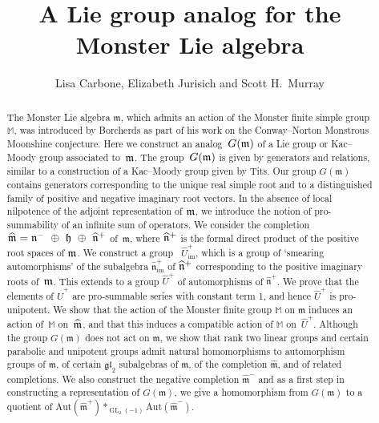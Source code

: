 \documentclass[11pt,letterpaper]{amsart}
\numberwithin{thecounter}{section}
\theoremstyle{definition}
\DeclareMathOperator{\GL}{GL}
\DeclareMathOperator{\Aut}{Aut}
\DeclareMathOperator{\Exp}{Exp}
\DeclareMathOperator{\Ad}{Ad}
\DeclareMathOperator{\im}{{im}}
\newcommand{\M}{{\mathbb M}}
\newcommand{\Uhp}{{\widehat{U}^+}}
\newcommand{\Uhimp}{{\widehat{U}_{\im}^+}}
\newcommand{\m}{{\mathfrak{m}}}
\newcommand{\nhp}{{\widehat{\mathfrak{n}}^+}}
\newcommand{\nhimp}{{\widehat{\mathfrak{n}}_{\im}^+}}
\begin{document}
\title[A Lie group analog for the Monster Lie algebra]{A Lie group analog for the Monster Lie algebra}
\author{Lisa Carbone, Elizabeth Jurisich and Scott H.\ Murray}



\begin{abstract}
The Monster Lie algebra $\m$, which admits an action of the Monster finite simple group $\mathbb{M}$, was introduced by Borcherds as part of his work on the Conway--Norton Monstrous Moonshine conjecture.
Here we construct an analog~$G(\frak m)$ of a Lie group or Kac--Moody group
associated to~$\frak m$. The group~$G(\frak m)$ is given by generators and relations, similar to a  construction of a Kac--Moody group given by Tits.   Our group $G(\mathfrak m)$ contains generators corresponding to the
unique real simple root and to a distinguished family of
positive and negative imaginary root vectors.
In the absence of local nilpotence of the adjoint representation  of $\frak m$, we introduce the notion of pro-summability of an infinite sum of operators. 
We consider the completion $\widehat{\mathfrak{m}}=\frak n^-\ \oplus\ \frak h\ \oplus\ \widehat{\frak n}^+$ of~$\mathfrak{m}$,  where $\widehat{\frak n}^+$ is the formal direct product of the positive root spaces of $\frak m$.  
 We construct a group ~$\Uhimp $, which is a group of `smearing automorphisms' of the subalgebra $\nhimp$ of $\widehat{\frak n}^+$ corresponding to the positive imaginary roots of~$\frak m$. This extends to a group $\Uhp$ of automorphisms  of $\nhp$.  We prove that the elements of $\Uhp$  are pro-summable   series with constant term 1, and hence $\Uhp$ is pro-unipotent.
We show that the action of the Monster finite group $\M$ on $\mathfrak m$ induces an action of~$\M$ on~$\widehat{\frak m}$, and that this induces a compatible  action of $\M$ on~$\Uhp$. %
Although the group $G(\mathfrak m)$ does not act on $\mathfrak m$, 
we show that  rank two linear groups and certain
parabolic and unipotent groups admit natural homomorphisms to
automorphism groups of $\mathfrak m$, of certain
$\mathfrak{gl}_2$ subalgebras of $\mathfrak m$, of the completion
$\widehat{\mathfrak m}$, and of related completions.
We also construct the negative completion $\widehat{\mathfrak{m}}^-$ and as a first step in  constructing a representation of $G(\mathfrak{m})$, we give a homomorphism from $G(\mathfrak{m})$ to a quotient of $\text{Aut}(\widehat{\mathfrak{m}}^+) *_{\GL_2(-1)} \text{Aut}(\widehat{\mathfrak{m}}^-).$
\end{abstract}
\end{document}
